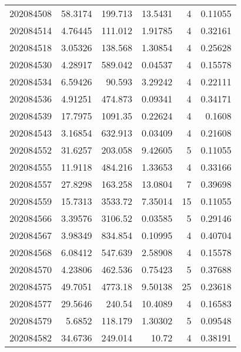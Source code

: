 \begin{tabular}{rrrrrr}
 202084508 &         58.3174  &      199.713  &           13.5431  &           4 & 0.11055 \\
 202084514 &          4.76445 &      111.012  &            1.91785 &           4 & 0.32161 \\
 202084518 &          3.05326 &      138.568  &            1.30854 &           4 & 0.25628 \\
 202084530 &          4.28917 &      589.042  &            0.04537 &           4 & 0.15578 \\
 202084534 &          6.59426 &       90.593  &            3.29242 &           4 & 0.22111 \\
 202084536 &          4.91251 &      474.873  &            0.09341 &           4 & 0.34171 \\
 202084539 &         17.7975  &     1091.35   &            0.22624 &           4 & 0.1608  \\
 202084543 &          3.16854 &      632.913  &            0.03409 &           4 & 0.21608 \\
 202084552 &         31.6257  &      203.058  &            9.42605 &           5 & 0.11055 \\
 202084555 &         11.9118  &      484.216  &            1.33653 &           4 & 0.33166 \\
 202084557 &         27.8298  &      163.258  &           13.0804  &           7 & 0.39698 \\
 202084559 &         15.7313  &     3533.72   &            7.35014 &          15 & 0.11055 \\
 202084566 &          3.39576 &     3106.52   &            0.03585 &           5 & 0.29146 \\
 202084567 &          3.98349 &      834.854  &            0.10995 &           4 & 0.40704 \\
 202084568 &          6.08412 &      547.639  &            2.58908 &           4 & 0.15578 \\
 202084570 &          4.23806 &      462.536  &            0.75423 &           5 & 0.37688 \\
 202084575 &         49.7051  &     4773.18   &            9.50138 &          25 & 0.23618 \\
 202084577 &         29.5646  &      240.54   &           10.4089  &           4 & 0.16583 \\
 202084579 &          5.6852  &      118.179  &            1.30302 &           5 & 0.09548 \\
 202084582 &         34.6736  &      249.014  &           10.72    &           4 & 0.38191 \\

\end{tabular}
